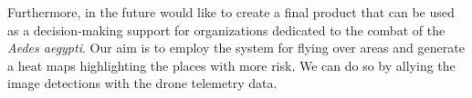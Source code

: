 Furthermore, in the future would like to create a final product that can be used as a decision-making support for organizations dedicated to the combat of the \textit{Aedes aegypti}.
Our aim is to employ the system for flying over areas and generate a heat maps highlighting the places with more risk.
We can do so by allying the image detections with the drone telemetry data.

%
%
